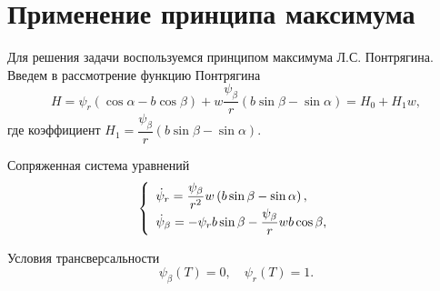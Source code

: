 \documentclass[a4paper,12pt, openany]{book}
\theoremstyle{plain} %
\theoremstyle{definition} %
\theoremstyle{remark} %
\numberwithin{equation}{chapter}
\begin{document}
{\section{Применение принципа максимума}
Для решения задачи воспользуемся принципом максимума Л.С. Понтрягина. Введем в рассмотрение функцию Понтрягина
\begin{equation}\label{4.6}
H = \psi _r \left( {\cos \alpha  - b\cos \beta } \right) + w\frac{{\psi _\beta  }}{r}\left( {b\sin \beta  - \sin \alpha } \right) = H_0 + H_1 w,
\end{equation}
где коэффициент $H_1  = \dfrac{{\psi _\beta  }}{r}\left( {b\sin \beta  - \sin \alpha } \right).
$

Сопряженная система уравнений
\begin{equation}\label{4.7}
\left\{ {\begin{array}{*{20}l}
   {\dot \psi _r  = \dfrac{{\psi _\beta  }}{{r^2 }}w\left( {b\sin \beta  - \sin \alpha } \right),} \hfill  \\
   {\dot \psi _\beta   =  - \psi _r b\sin \beta  - \dfrac{{\psi _\beta  }}{r}wb\cos \beta ,} \hfill  \\
\end{array}} \right.
\end{equation}


Условия трансверсальности 
\begin{equation}\label{4.8}
\psi _\beta  \left( T \right) = 0,\quad  \psi_r(T) = 1.
\end{equation}

}
\end{document}
